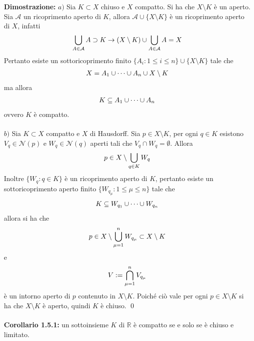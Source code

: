 \documentclass{article}
\begin{document}
\textbf{Dimostrazione:} $a)$ Sia $K \subset X$ chiuso e $X$ compatto. Si ha che $X \setminus K$ è un aperto. Sia $\mathcal{A}$ un ricoprimento aperto di $K$, allora $\mathcal{A} \cup \{X \setminus K\}$ è un ricoprimento aperto di $X$, infatti
\begin{gather}
    \bigcup_{A \in \mathcal{A}} A \supset K \rightarrow (X \setminus K) \cup \bigcup_{A \in \mathcal{A}} A = X \notag
\end{gather}
Pertanto esiste un sottoricoprimento finito $\{A_i : 1 \leq i \leq n \} \cup \{ X \setminus K \}$ tale che
\begin{gather}
    X = A_1 \cup \dots \cup A_n \cup X \setminus K \notag
\end{gather}
ma allora
\begin{gather}
    K \subseteq A_1 \cup \dots \cup A_n \notag
\end{gather}
ovvero $K$ è compatto. \\ \\
$b)$ Sia $K \subset X$ compatto e $X$ di Hausdorff. Sia $p \in X \setminus K$, per ogni $q \in K$ esistono $V_q \in \mathcal{N}(p)$ e $W_q \in \mathcal{N}(q)$ aperti tali che $V_q \cap W_q = \emptyset$. Allora
\begin{gather}
    p \in X \setminus \bigcup_{q \in K} W_q \notag
\end{gather}
Inoltre $\{ W_q : q \in K \}$ è un ricoprimento aperto di $K$, pertanto esiste un sottoricoprimento aperto finito $\{ W_{q_\mu} : 1 \leq \mu \leq n \}$ tale che
\begin{gather}
    K \subseteq W_{q_1} \cup \dots \cup W_{q_n} \notag
\end{gather}
allora si ha che
\begin{gather}
    p \in X \setminus \bigcup_{\mu = 1}^n W_{q_\mu} \subset X \setminus K \notag
\end{gather}
e
\begin{gather}
    V := \bigcap_{\mu = 1}^n V_{q_\mu} \notag
\end{gather}
è un intorno aperto di $p$ contenuto in $X \setminus K$. Poiché ciò vale per ogni $p \in X \setminus K$ si ha che $X \setminus K$ è aperto, quindi $K$ è chiuso. \qed \\ \\
\textbf{Corollario 1.5.1:} un sottoinsieme $K$ di $\mathbb{R}$ è compatto se e solo se è chiuso e limitato. \\
\end{document}
